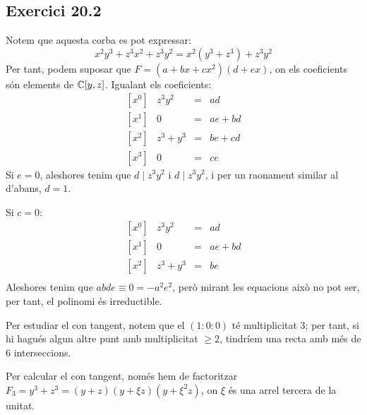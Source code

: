 \documentclass[11pt, a4paper]{article}
\begin{document}
\subsection{Exercici 20.2}
Notem que aquesta corba es pot expressar:
\[
    x^2y^3+z^3x^2+z^3y^2=x^2(y^3+z^3)+z^3y^2
\]
Per tant, podem suposar que $F=(a+bx+cx^2)(d+ex)$, on els coeficients són elements de $\mathbb C[y,z]$. Igualant els coeficients:
\[
    \begin{array}{lrcl}
       {[x^0]}&z^3y^2  & = &ad\\
       {[x^1]}&0       & = &ae+bd\\
       {[x^2]}&z^3+y^3 & = &be+cd\\
       {[x^3]}&0       & = &ce
    \end{array}
\]
Si $e=0$, aleshores tenim que $d\mid z^3y^2$ i $d\mid z^3y^2$, i per un raonament similar al d'abans, $d=1$.\par
Si $c=0$:
\[
    \begin{array}{lrcl}
       {[x^0]}&z^3y^2  & = &ad\\
       {[x^1]}&0       & = &ae+bd\\
       {[x^2]}&z^3+y^3 & = &be\\
    \end{array}
\]
Aleshores tenim que $abde\equiv 0=-a^2e^2$, però mirant les equacions això no pot ser, per tant, el polinomi és irreductible.\par
Per estudiar el con tangent, notem que el $(1:0:0)$ té multiplicitat 3; per tant, si hi hagués algun altre punt amb multiplicitat $\geq 2$, tindríem una recta amb més de $6$ interseccions.\par
Per calcular el con tangent, només hem de factoritzar $F_3=y^3+z^3=(y+z)(y+\xi z)(y+\xi^2 z)$, on $\xi$ és una arrel tercera de la unitat.
\end{document}

